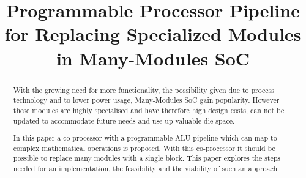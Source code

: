 \documentclass[11pt,twocolumn,technote,a4paper]{IEEEtran}
\begin{document}
\title{\huge{Programmable Processor Pipeline for Replacing Specialized Modules in Many-Modules SoC}}

\author{
}

\maketitle

\begin{abstract}
With the growing need for more functionality, the possibility given due to
process technology and to lower power usage, Many-Modules SoC gain popularity.
However these modules are highly specialised and have therefore high design
costs, can not be updated to accommodate future needs and use up valuable
die space.

In this paper a co-processor with a programmable ALU pipeline which can map
to complex mathematical operations is proposed. With this co-processor it
should be possible to replace many modules with a single block. This paper
explores the steps needed for an implementation, the feasibility and the
viability of such an approach.

\end{abstract}

\IEEEpeerreviewmaketitle

\renewcommand{\contentsname}{\small{Table of Contents}}
\end{document}
